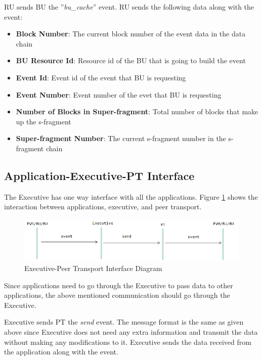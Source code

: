 RU sends BU the ''\textit{bu\_cache}'' event. RU sends the following data along with the event:

\begin{itemize}
	\item \textbf{Block Number}: The current block number of the event data in the data chain
	\item	\textbf{BU Resource Id}: Resource id of the BU that is going to build the event
	\item \textbf{Event Id}: Event id of the event that BU is requesting
	\item \textbf{Event Number}: Event number of the evet that BU is requesting
	\item \textbf{Number of Blocks in Super-fragment}: Total number of blocks that make up the s-fragment
	\item \textbf{Super-fragment Number}: The current s-fragment number in the s-fragment chain
\end{itemize}


\subsection{Application-Executive-PT Interface}

The Executive has one way interface with all the applications. Figure \ref{fig:exec-pt} shows the interaction between applications, executive, and peer transport.

\begin{figure}
	\centering
		\includegraphics[width=1.0\textwidth]{figures/exec-pt.png}
	\caption{Executive-Peer Transport Interface Diagram}
	\label{fig:exec-pt}
\end{figure}

Since applications need to go through the Executive to pass data to other applications, the above mentioned communication should go through the Executive. 

Executive sends PT the \textit{send} event. The message format is the same as given above since Executive does not need any extra information and transmit the data without making any modifications to it. Executive sends the data received from the application along with the event. 

